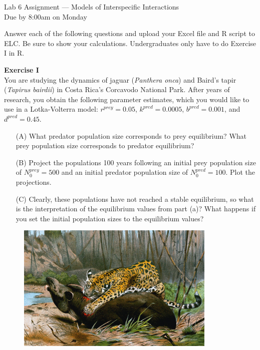 \documentclass[12pt]{article}\usepackage[]{graphicx}\usepackage[]{xcolor}
\begin{document}
{
  \Large
  \centering
  Lab 6 Assignment --- Models of Interspecific Interactions \\
  Due by 8:00am on Monday \par
}

Answer each of the following questions and upload your Excel file and
R script to ELC. Be sure to show your calculations. Undergraduates
only have to do Exercise I in R.  \\


\vspace{6pt}

{\bf Exercise I \\}
You are studying the dynamics of jaguar (\textit{Panthera onca}) and Baird's
tapir (\textit{Tapirus bairdii}) in Costa Rica's Corcavodo National Park. After
years of research, you obtain the following parameter estimates, which
you would like to use in a Lotka-Volterra model: $r^{prey}=0.05$,
$k^{pred}=0.0005$, $b^{pred}=0.001$, and $d^{pred}=0.45$.  
\begin{enumerate}
  \item[(A)] What predator population size corresponds to prey equilibrium?
    What prey population size corresponds to predator equilibrium? 
  \item[(B)] Project the populations 100 years following an initial prey
    population size of $N_0^{prey}=500$ and an initial predator
    population size of $N_0^{pred}=100$. Plot the projections.  
  \item[(C)] Clearly, these populations have not reached a stable
    equilibrium, so what is the interpretation of the equilibrium
    values from part (a)? What happens if you set the initial
    population sizes to the equilibrium values?  
\end{enumerate}

\vspace{12pt}

\begin{figure}[h!]
  \centering
  \includegraphics[width=0.85\textwidth]{jaguar_killing_tapir}
  \label{fig:jag-tapir}
\end{figure}
\end{document}
